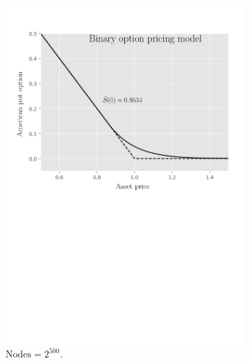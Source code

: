 \begin{figure}[tbp]
  \centering
  \begin{subfigure}{0.4\textwidth}
    \centering
    \includegraphics[width=\textwidth]{chapters/chapter3/TestCase2BOPM.pdf}
    \caption{$\text{Nodes} = 2^{500}$.}
    \label{fig:finitedifferencesschemes:numericaresults:test_case_2_bopm}
  \end{subfigure}
  \hspace{0.5cm}
  \begin{subfigure}{0.4\textwidth}
    \centering

\end{subfigure}
\end{figure}
